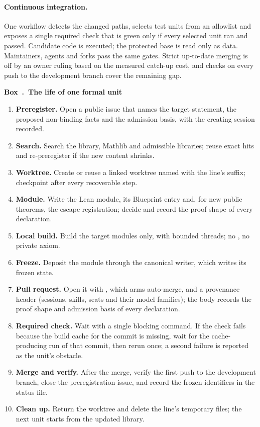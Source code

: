 \documentclass[11pt]{article}
\newcommand{\code}[1]{\texttt{\detokenize{#1}}}
\newcounter{protocolbox}
\newenvironment{protocol}[1]{\refstepcounter{protocolbox}\begin{framed}\noindent\textbf{Box~\theprotocolbox.\ #1}\par\small}{\end{framed}}
\begin{document}
\paragraph{Continuous integration.} One workflow detects the changed paths,
selects test units from an allowlist and exposes a single required check that
is green only if every selected unit ran and passed. Candidate code is
executed; the protected base is read only as data. Maintainers, agents and
forks pass the same gates. Strict up-to-date merging is off by an owner
ruling based on the measured catch-up cost, and checks on every push to the
development branch cover the remaining gap.

\begin{protocol}{The life of one formal unit}
\label{box:unit}
\begin{enumerate}[leftmargin=*,itemsep=1pt]
\item \textbf{Preregister.} Open a public issue that names the target
statement, the proposed non-binding facts and the admission basis, with the
creating session recorded.
\item \textbf{Search.} Search the library, Mathlib and admissible libraries;
reuse exact hits and re-preregister if the new content shrinks.
\item \textbf{Worktree.} Create or reuse a linked worktree named with the
line's suffix; checkpoint after every recoverable step.
\item \textbf{Module.} Write the Lean module, its Blueprint entry and, for new
public theorems, the escape registration; decide and record the proof shape
of every declaration.
\item \textbf{Local build.} Build the target modules only, with bounded
threads; no \code{sorry}, no private axiom.
\item \textbf{Freeze.} Deposit the module through the canonical writer, which
writes its frozen state.
\item \textbf{Pull request.} Open it with \code{make pr}, which arms
auto-merge, and a provenance header (sessions, skills, seats and their model
families); the body records the proof shape and admission basis of every
declaration.
\item \textbf{Required check.} Wait with a single blocking command. If the
check fails because the build cache for the commit is missing, wait for the
cache-producing run of that commit, then rerun once; a second failure is
reported as the unit's obstacle.
\item \textbf{Merge and verify.} After the merge, verify the first push to
the development branch, close the preregistration issue, and record the
frozen identifiers in the status file.
\item \textbf{Clean up.} Return the worktree and delete the line's temporary
files; the next unit starts from the updated library.
\end{enumerate}
\end{protocol}
\end{document}
